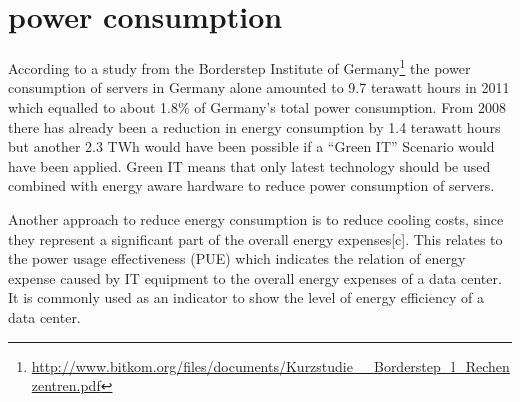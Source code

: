 \section{power consumption}

According to a study from the Borderstep Institute of Germany\footnote{\url{http://www.bitkom.org/files/documents/Kurzstudie__Borderstep_l_Rechenzentren.pdf}} the power consumption of servers in Germany alone amounted to 9.7 terawatt hours in 2011 which equalled to about 1.8\% of Germany's total power consumption. From 2008 there has already been a reduction in energy consumption by 1.4 terawatt hours but another 2.3 TWh would have been possible if a "`Green IT"' Scenario would have been applied. Green IT means that only latest technology should be used combined with energy aware hardware to reduce power consumption of servers. 

Another approach to reduce energy consumption is to reduce cooling costs, since they represent a significant part of the overall energy expenses[c]. This relates to the power usage effectiveness (PUE) which indicates the relation of energy expense caused by IT equipment to the overall energy expenses of a data center. It is commonly used as an indicator to show the level of energy efficiency of a data center. 

